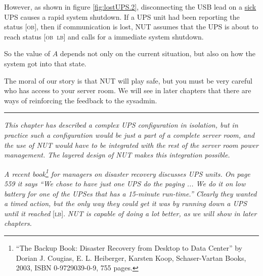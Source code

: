 \documentclass[12pt]{article}
\newcommand{\LB}{\textcolor{UPSDCOLOUR}{\textsc{lb}}}
\newcommand{\OB}{\textcolor{UPSDCOLOUR}{\textsc{ob}}}
\newcommand{\status}[1]{\textcolor{UPSDCOLOUR}{[{#1}]}}
\begin{document}
However, as shown in figure \ref{fig:lostUPS.2}, disconnecting the USB lead on
a \underline{sick} UPS causes a rapid system shutdown.  If a UPS unit had been
reporting the status \status{\OB}, then if communication is lost, NUT assumes
that the UPS is about to reach status \status {\OB\ \LB} and calls for a immediate
system shutdown.

So the value of $A$ depends not only on the current situation, but also on how
the system got into that state.

The moral of our story is that NUT will play safe, but you must be very
careful who has access to your server room.  We will see in later chapters
that there are ways of reinforcing the feedback to the sysadmin.

\vspace*{\fill}
\begin{center}\rule{\LinePrinterwidth}{0.5mm}\end{center}
\vspace*{\fill}

\textsl{This chapter has described a complex UPS configuration in isolation,
  but in practice such a configuration would be just a part of a complete
  server room, and the use of NUT would have to be integrated with the rest of
  the server room power management.  The layered design of NUT makes this
  integration possible.}



\vspace*{\fill}

\begin{center}
\end{center}

\vspace*{\fill}

\textsl{A recent book\footnote{``The Backup Book: Disaster Recovery
  from Desktop to Data Center'' by Dorian J. Cougias, E. L. Heiberger,
  Karsten Koop, Schaser-Vartan Books, 2003, ISBN 0-9729039-0-9, 755
  pages.}  for managers on disaster recovery discusses UPS units.  On
  page 559 it says ``We chose to have just one UPS do the paging
  ... We do it on low battery for one of the UPSes that has a
  15-minute run-time.''  Clearly they wanted a timed action, but the
  only way they could get it was by running down a UPS until it
  reached} \status{\LB}.  \textsl{NUT is capable of doing a lot
  better, as we will show in later chapters.}

\vspace*{\fill}
\end{document}
